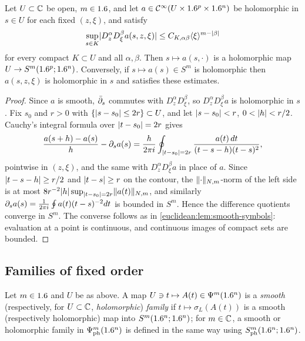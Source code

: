\begin{lemma}\label{euclidean:lem:holomorphic-symbols}
  Let $U\subset\mathbb{C}$ be open, $m\in1.6$, and let
  $a\in\mathcal{C}^\infty(U\times1.6^p\times1.6^n)$ be holomorphic in $s\in U$ for each fixed
  $(z,\xi)$, and satisfy
  \begin{equation*}
    \sup_{s\in K}\lvert D^\alpha_zD^\beta_\xi a(s,z,\xi)\rvert\le
    C_{K,\alpha\beta}\langle \xi\rangle^{m-\lvert \beta\rvert}
  \end{equation*}
  for every compact $K\subset U$ and all $\alpha,\beta$. Then
  $s\mapsto a(s,\cdot)$ is a holomorphic map $U\to S^m(1.6^p;1.6^n)$.
  Conversely, if $s\mapsto a(s)\in S^m$ is holomorphic then $a(s,z,\xi)$ is
  holomorphic in $s$ and satisfies these estimates.
\end{lemma}
\begin{proof}
  Since $a$ is smooth, $\bar{\partial}_s$ commutes with $D^\alpha_zD^\beta_\xi$, so
  $D^\alpha_zD^\beta_\xi a$ is holomorphic in $s$. Fix $s_0$ and $r>0$ with
  $\{\lvert s-s_0\rvert\le2r\}\subset U$, and let $\lvert s-s_0\rvert<r$,
  $0<\lvert h\rvert<r/2$. Cauchy's integral formula over $\lvert t-s_0\rvert=2r$ gives
  \begin{equation*}
    \frac{a(s+h)-a(s)}h-\partial_sa(s)=\frac h{2\pi i}\oint_{\lvert t-s_0\rvert=2r}
    \frac{a(t)\,dt}{(t-s-h)(t-s)^2},
  \end{equation*}
  pointwise in $(z,\xi)$, and the same with $D^\alpha_zD^\beta_\xi a$ in place of
  $a$. Since $\lvert t-s-h\rvert\ge r/2$ and $\lvert t-s\rvert\ge r$ on the contour, the
  $\lVert \cdot\rVert_{N,m}$-norm of the left side is at most
  $8r^{-2}\lvert h\rvert\sup_{\lvert t-s_0\rvert=2r}\lVert a(t)\rVert_{N,m}$, and similarly
  $\partial_sa(s)=\frac1{2\pi i}\oint a(t)(t-s)^{-2}dt$ is bounded in $S^m$. Hence
  the difference quotients converge in $S^m$. The converse follows as in
  \cref{euclidean:lem:smooth-symbols}: evaluation at a point is continuous,
  and continuous images of compact sets are bounded.
\end{proof}

\subsection{Families of fixed order}

\begin{definition}\label{euclidean:def:smooth-family}
  Let $m\in1.6$ and $U$ be as above. A map $U\ni t\mapsto A(t)\in\Psi^{m}(1.6^n)$
  is a \emph{smooth} \textup{(}respectively, for $U\subset\mathbb{C}$,
  \emph{holomorphic}\textup{)} \emph{family} if $t\mapsto\sigma_L(A(t))$ is a
  smooth \textup{(}respectively holomorphic\textup{)} map into
  $S^m(1.6^n;1.6^n)$; for $m\in\mathbb{C}$, a smooth or holomorphic family in
  $\Psi^{m}_{\mathrm{ph}}(1.6^n)$ is defined in the same way using
  $S^{m}_{\mathrm{ph}}(1.6^n;1.6^n)$.
\end{definition}

